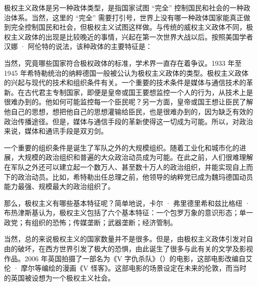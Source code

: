 
极权主义政体是另一种政体类型，是指国家试图 “完全” 控制国民和社会的一种政治体系。当然，这里的 “完全” 需要打引号，世界上没有哪一种政体国家能真正做到完全控制国民和社会，但极权主义试图这样做。与传统的威权主义政体不同，极权主义政体的出现是比较晚近的事情，兴起在第一次世界大战以后。按照美国学者汉娜 · 阿伦特的说法，该种政体的主要特征是：


当然，究竟哪些国家符合极权政体的标准，学术界一直存在着争议。1933 年至 1945 年希特勒统治的纳粹德国一般被公认为极权主义政体的类型。极权主义政体的兴起与现代的技术和组织条件有关。一个重要的技术条件是媒体与通信技术的革新。在古代君主专制国家，即便是皇帝或国王要想监控一个人的行为，从技术上是很难办到的。他如何可能监控每一个臣民呢？另一方面，皇帝或国王想让臣民了解他自己的思想，想把他自己的思想灌输给臣民，也是很难办到的，因为缺乏有效的政治传播途径。但是，媒体与通信手段的革新使得这一切成为可能。所以，对政治来说，媒体和通讯手段是双刃剑。

一个重要的组织条件是诞生了军队之外的大规模组织。随着工业化和城市化的进展，大规模的政治组织和普遍的大众政治动员成为可能。在此之前，人们很难理解在军队之外还可以建立起一个数万人、甚至数十万人的政治组织，并能实现自上而下的政治动员。比如，希特勒出任总理之前，他领导的纳粹党已成为魏玛德国动员能力最强、规模最大的政治组织了。

那么，极权主义有哪些基本特征呢？简单地说，卡尔 · 弗里德里希和兹比格纽 · 布热津斯基认为，极权主义包括了六个基本特征：一个包罗万象的意识形态；单一政党；有组织的恐怖；传媒垄断；武器垄断；经济管制。

当然，总的来说极权主义的国家数量并不是很多。但是，由极权主义政体引发对自由的破坏，在西方世界引发了极大的恐惧，由此诞生了很多与此有关的文学及影视作品。2006 年英国拍摄了一部名为《V 字仇杀队》（）的电影，这部电影改编自艾伦 · 摩尔等编绘的漫画《V 怪客》。这部电影的场景设定在未来的伦敦，而当时的英国被设想为一个极权主义社会。

